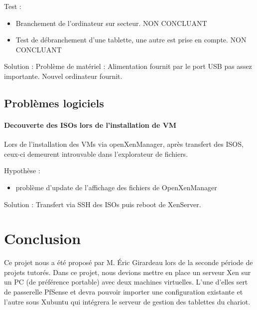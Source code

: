 \documentclass[a4paper,12pt]{extarticle}
\begin{document}
Test :
\begin{itemize}
\item Branchement de l'ordinateur sur secteur. NON CONCLUANT
\item Test de débranchement d'une tablette, une autre est prise en compte. NON CONCLUANT \\
\end{itemize}

Solution :
Problème de matériel : Alimentation fournit par le port USB pas assez importante. 
Nouvel ordinateur fournit.


\subsection{Problèmes logiciels}


\paragraph{Decouverte des ISOs lors de l'installation de VM\\}
Lors de l'installation des VMs via openXenManager, après transfert des ISOS, ceux-ci demeurent introuvable dans l'explorateur de fichiers.

Hypothèse :
\begin{itemize}
\item problème d'update de l'affichage des fichiers de OpenXenManager\\
\end{itemize}

Solution :
Transfert via SSH des ISOs puis reboot de XenServer.\\


\clearpage

\section{Conclusion}
Ce projet nous a été proposé par M. Éric Girardeau lors de la seconde période de projets tutorés. Dans ce projet, nous devions mettre en place un serveur Xen sur un PC (de préférence portable) avec deux machines virtuelles. L’une d’elles sert de passerelle PfSense et devra pouvoir importer une configuration existante et l’autre sous Xubuntu qui intégrera le serveur de gestion des tablettes du chariot.\\
\end{document}
